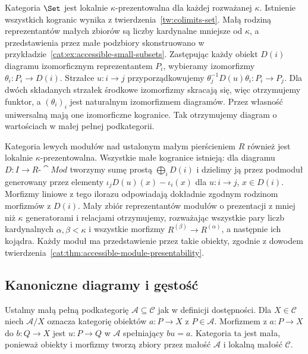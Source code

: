 \begin{przyklad}\label{cat:ex:accessible-set-mod-local}
Kategoria $\Set$ jest lokalnie $\kappa$-prezentowalna dla każdej rozważanej $\kappa$. Istnienie wszystkich kogranic wynika z twierdzenia~\ref{tw:colimits-set}. Małą rodziną reprezentantów małych zbiorów są liczby kardynalne mniejsze od $\kappa$, a przedstawienia przez małe podzbiory skonstruowano w przykładzie~\ref{cat:ex:accessible-small-subsets}. Zastępując każdy obiekt $D(i)$ diagramu izomorficznym reprezentantem $P_i$, wybieramy izomorfizmy $\theta_i:P_i\to D(i)$. Strzałce $u:i\to j$ przyporządkowujemy $\theta_j^{-1}D(u)\theta_i:P_i\to P_j$. Dla dwóch składanych strzałek środkowe izomorfizmy skracają się, więc otrzymujemy funktor, a $(\theta_i)_i$ jest naturalnym izomorfizmem diagramów. Przez własność uniwersalną mają one izomorficzne kogranice. Tak otrzymujemy diagram o wartościach w małej pełnej podkategorii.

Kategoria lewych modułów nad ustalonym małym pierścieniem $R$ również jest lokalnie $\kappa$-prezentowalna. Wszystkie małe kogranice istnieją: dla diagramu $D:I\to R\text{-}\cat{Mod}$ tworzymy sumę prostą $\bigoplus_iD(i)$ i dzielimy ją przez podmoduł generowany przez elementy $\iota_j D(u)(x)-\iota_i(x)$ dla $u:i\to j$, $x\in D(i)$. Morfizmy liniowe z tego ilorazu odpowiadają dokładnie zgodnym rodzinom morfizmów z $D(i)$. Mały zbiór reprezentantów modułów o prezentacji z mniej niż $\kappa$ generatorami i relacjami otrzymujemy, rozważając wszystkie pary liczb kardynalnych $\alpha,\beta<\kappa$ i wszystkie morfizmy $R^{(\beta)}\to R^{(\alpha)}$, a następnie ich kojądra. Każdy moduł ma przedstawienie przez takie obiekty, zgodnie z dowodem twierdzenia~\ref{cat:thm:accessible-module-presentability}.
\end{przyklad}

\subsection{Kanoniczne diagramy i gęstość}

Ustalmy małą pełną podkategorię $\mathcal A\subseteq\mathcal C$ jak w definicji dostępności. Dla $X\in\mathcal C$ niech $\mathcal A/X$ oznacza kategorię obiektów $a:P\to X$ z $P\in\mathcal A$. Morfizmem z $a:P\to X$ do $b:Q\to X$ jest $u:P\to Q$ w $\mathcal A$ spełniający $bu=a$. Kategoria ta jest mała, ponieważ obiekty i morfizmy tworzą zbiory przez małość $\mathcal A$ i lokalną małość $\mathcal C$.

